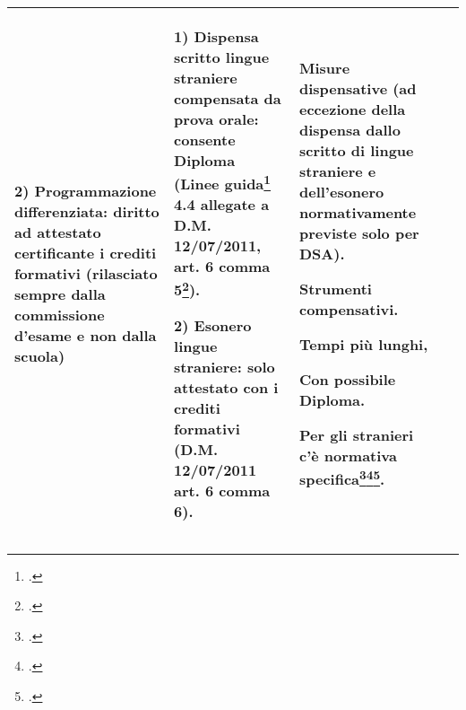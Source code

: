 \begin{longtable}{p{}p{}p{}p{}}
 \textbf{2) Programmazione differenziata:} diritto ad attestato certificante i crediti formativi (rilasciato sempre dalla commissione d'esame e non dalla scuola) 
 &
 \textbf{1) Dispensa scritto lingue straniere compensata da prova orale:} consente Diploma (Linee guida\footcite{LineGuida2011} 4.4 allegate a D.M. 12/07/2011, art. 6 comma 5\footcite{DM_122_2011}).
 
 \textbf{2) Esonero lingue straniere:} solo attestato con i crediti formativi (D.M. 12/07/2011 art. 6 comma 6).
 &Misure dispensative (ad eccezione della dispensa dallo scritto di lingue straniere e dell'esonero normativamente previste solo per DSA).
 
 Strumenti compensativi.
 
 Tempi più lunghi,
 
 Con possibile Diploma.
 
 Per gli stranieri c'è normativa specifica\footcite{CM_2_2010}\footcite{MIUR2007}\footcite{CM_24_2006}.\\
 \bottomrule
\end{longtable}